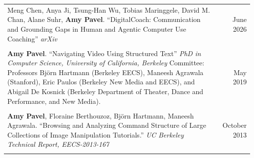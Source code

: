 \begin{longtable}{Xr}
	Meng Chen, Anya Ji, Tsung-Han Wu, Tobias Maringgele, David M. Chan, Alane Suhr, \textbf{Amy Pavel}. ``DigitalCoach: Communication and Grounding Gaps in Human and Agentic Computer Use Coaching'' \textit{arXiv} & June 2026 \\
	\\

	\textbf{Amy Pavel}. ``Navigating Video Using Structured Text'' \textit{PhD in Computer Science, University of California, Berkeley} Committee: Professors Björn Hartmann (Berkeley EECS), Maneesh Agrawala (Stanford), Eric Paulos (Berkeley New Media and EECS), and Abigail De Kosnick (Berkeley Department of Theater, Dance and Performance, and New Media). & May 2019 \\
	\\

	\textbf{Amy Pavel}, Floraine Berthouzoz, Björn Hartmann, Maneesh Agrawala. ``Browsing and Analyzing Command Structure of Large Collections of Image Manipulation Tutorials.'' \textit{UC Berkeley Technical Report, EECS-2013-167} & October 2013 \\
	\\

\end{longtable}